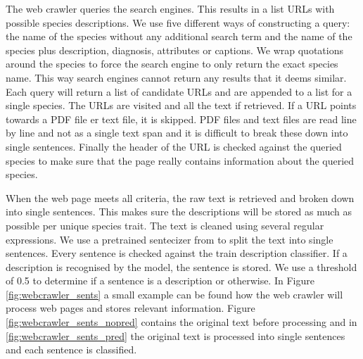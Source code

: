 \documentclass[a4paper, 12pt, oneside]{book} %
\begin{document}
The web crawler queries the search engines. 
This results in a list URLs with possible species descriptions.
We use five different ways of constructing a query: the name of the species without any additional search term and the name of the species plus description, diagnosis, attributes or captions.
We wrap quotations around the species to force the search engine to only return the exact species name. 
This way search engines cannot return any results that it deems similar.
Each query will return a list of candidate URLs and are appended to a list for a single species.
The URLs are visited and all the text if retrieved.
If a URL points towards a PDF file er text file, it is skipped.
PDF files and text files are read line by line and not as a single text span and it is difficult to break these down into single sentences. 
Finally the header of the URL is checked against the queried species to make sure that the page really contains information about the queried species.

When the web page meets all criteria, the raw text is retrieved and broken down into single sentences. 
This makes sure the descriptions will be stored as much as possible per unique species trait.
The text is cleaned using several regular expressions. %
We use a pretrained sentecizer from \textcite{wolf_huggingfaces_2020} to split the text into single sentences.
Every sentence is checked against the train description classifier.
If a description is recognised by the model, the sentence is stored.
We use a threshold of 0.5 to determine if a sentence is a description or otherwise.
In Figure \ref{fig:webcrawler_sents} a small example can be found how the web crawler will process web pages and stores relevant information. 
Figure \ref{fig:webcrawler_sents_nopred} contains the original text before processing and in \ref{fig:webcrawler_sents_pred} the original text is processed into single sentences and each sentence is classified.
\end{document}

